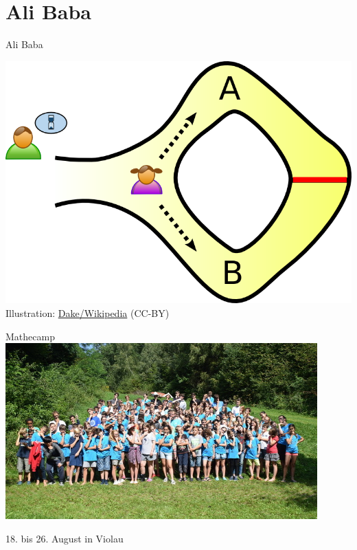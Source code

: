 \documentclass[12pt,compress,ngerman,utf8,t]{beamer}
\newcommand{\redheart}{\scalebox{1.2}{\textcolor{mypurple}{$\varheartsuit$}}}
\newcommand{\withsource}[2]{\begin{center}#1\\\tiny #2\end{center}}
\begin{document}
\section{Ali Baba}

\begin{frame}{Ali Baba}
  \centering
  \withsource{\includegraphics[height=0.7\textheight]{alibaba1}}{Illustration:
  \href{https://commons.wikimedia.org/wiki/File:Zkip_alibaba1.png}{Dake/Wikipedia} (CC-BY)}
\end{frame}


\appendix

\begin{frame}{Mathecamp}
  \centering
  \includegraphics[width=0.9\textwidth]{mathecamp-gruppenfoto}
  \medskip

  \redheart{} 18. bis 26. August in Violau \redheart{}
\end{frame}
\end{document}
